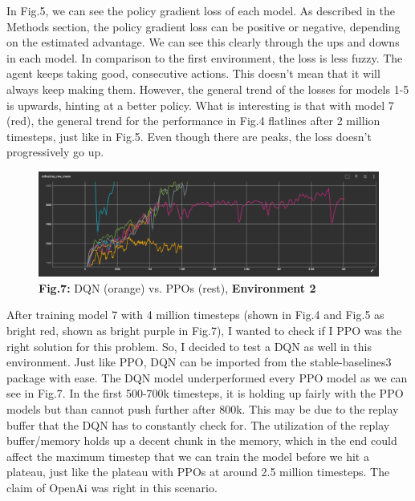 \documentclass{article}
\numberwithin{equation}{section}
\numberwithin{equation}{section}
\begin{document}
In Fig.5, we can see the policy gradient loss of each model. As described in the Methods section, the policy gradient loss can be positive or negative, depending on the estimated advantage. We can see this clearly through the ups and downs in each model. In comparison to the first environment, the loss is less fuzzy. The agent keeps taking good, consecutive actions. This doesn't mean that it will always keep making them. However, the general trend of the losses for models 1-5 is upwards, hinting at a better policy. What is interesting is that with model 7 (red), the general trend for the performance in Fig.4 flatlines after 2 million timesteps, just like in Fig.5. Even though there are peaks, the loss doesn't progressively go up. 




\begin{figure}[H]
	\centering
\includegraphics[scale=3,width=\linewidth]{dqn_vs_ppo_env2.png}
	\\	
	\vspace{0.1in}
	\textbf{Fig.7:} DQN (orange) vs. PPOs (rest), \textbf{Environment 2}
	\\
	\label{fig:Fig.3}
\end{figure}

After training model 7 with 4 million timesteps (shown in Fig.4 and Fig.5 as bright red, shown as bright purple in Fig.7), I wanted to check if I PPO was the right solution for this problem. So, I decided to test a DQN as well in this environment. Just like PPO, DQN can be imported from the stable-baselines3 package with ease. The DQN model underperformed every PPO model as we can see in Fig.7. In the first 500-700k timesteps, it is holding up fairly with the PPO models but than cannot push further after 800k. This may be due to the replay buffer that the DQN has to constantly check for. The utilization of the replay buffer/memory holds up a decent chunk in the memory, which in the end could affect the maximum timestep that we can train the model before we hit a plateau, just like the plateau with PPOs at around 2.5 million timesteps. The claim of OpenAi was right in this scenario.
\end{document}
